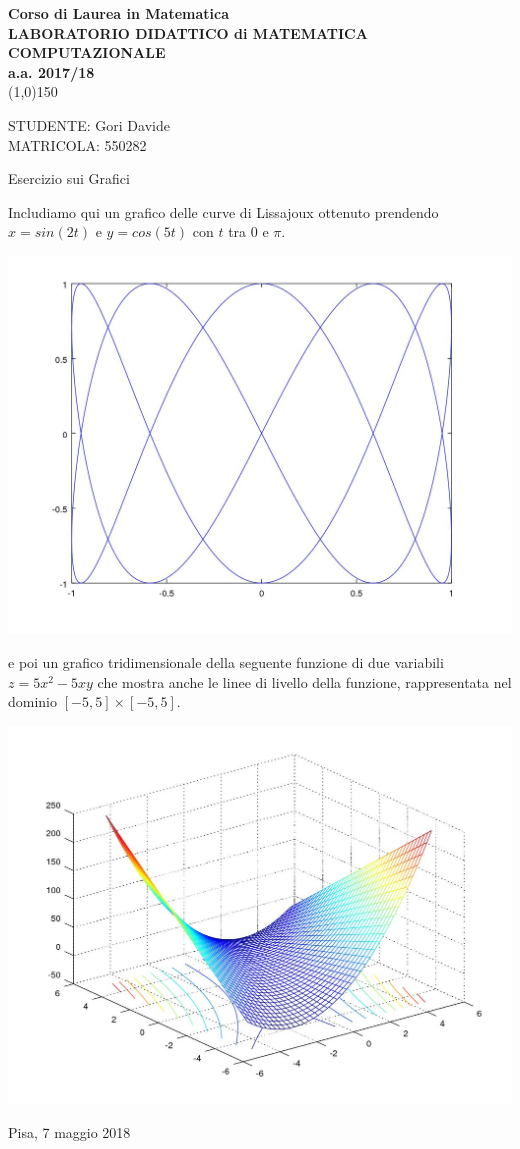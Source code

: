 \documentclass[a4paper,11pt] {article}
\begin{document}
\begin{center}
\textbf{
Corso di Laurea in Matematica
\\
LABORATORIO DIDATTICO di MATEMATICA COMPUTAZIONALE
\\
a.a. 2017/18
\\
}
\line(1,0){150}
\end{center}
STUDENTE: Gori Davide \\
MATRICOLA: 550282
\begin{center}
	Esercizio sui Grafici
\end{center}

	Includiamo qui un grafico delle curve di Lissajoux ottenuto prendendo $x = sin(2t)$ e $y = cos(5t)$ con $t$ tra $0$ e $\pi$.
	\begin{center}
		\includegraphics[width=0.4 \textwidth]{gra_1.jpeg}
	\end{center}
	e poi un grafico tridimensionale della seguente funzione di due variabili $z=5 x^2-5 xy$ che mostra anche le linee di livello della funzione, rappresentata nel dominio $[-5, 5] \times [-5, 5]$.
	\begin{center}
		\includegraphics[width=0.4 \textwidth]{gra_2.jpeg}
	\end{center}
	Pisa, 7 maggio 2018
\end{document}
